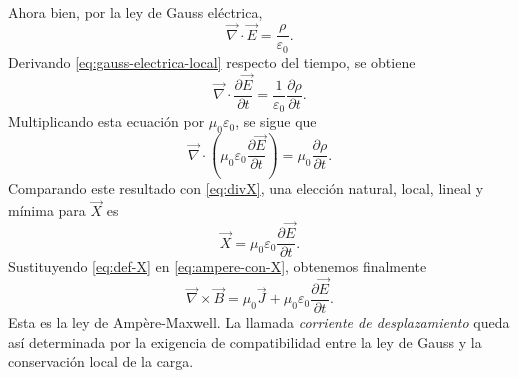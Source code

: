 \documentclass[12pt,a4paper]{article}
\theoremstyle{definition}
\theoremstyle{plain}
\numberwithin{equation}{section}
\theoremstyle{remark}
\newcommand{\E}{\vec{E}}
\newcommand{\B}{\vec{B}}
\newcommand{\J}{\vec{J}}
\begin{document}
Ahora bien, por la ley de Gauss eléctrica,
\begin{equation}
    \vec\nabla\cdot\E=\frac{\rho}{\varepsilon_0}.
    \label{eq:gauss-electrica-local}
\end{equation}
Derivando \eqref{eq:gauss-electrica-local} respecto del tiempo, se obtiene
\begin{equation*}
    \vec\nabla\cdot\frac{\partial \E}{\partial t}=\frac{1}{\varepsilon_0}\frac{\partial \rho}{\partial t}.
\end{equation*}
Multiplicando esta ecuación por $\mu_0\varepsilon_0$, se sigue que
\begin{equation*}
    \vec\nabla\cdot\left(\mu_0\varepsilon_0\frac{\partial \E}{\partial t}\right)=\mu_0\frac{\partial \rho}{\partial t}.
\end{equation*}
Comparando este resultado con \eqref{eq:divX}, una elección natural, local, lineal y mínima para $\vec X$ es
\begin{equation}
    \vec X=\mu_0\varepsilon_0\frac{\partial \E}{\partial t}.
    \label{eq:def-X}
\end{equation}
Sustituyendo \eqref{eq:def-X} en \eqref{eq:ampere-con-X}, obtenemos finalmente
\begin{equation*}
    \vec\nabla\times\B=\mu_0\J+\mu_0\varepsilon_0\frac{\partial \E}{\partial t}.
\end{equation*}
Esta es la ley de Ampère-Maxwell. La llamada \textit{corriente de desplazamiento} queda así determinada por la exigencia de compatibilidad entre la ley de Gauss y la conservación local de la carga.
\end{document}
